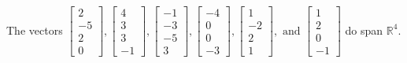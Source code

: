 \begin{exercise}
\begin{exerciseStatement}
  \end{exerciseStatement}
  \begin{exerciseAnswer}
   The vectors \(\left[\begin{array}{r}
2 \\
-5 \\
2 \\
0
\end{array}\right] , \left[\begin{array}{r}
4 \\
3 \\
3 \\
-1
\end{array}\right] , \left[\begin{array}{r}
-1 \\
-3 \\
-5 \\
3
\end{array}\right] , \left[\begin{array}{r}
-4 \\
0 \\
0 \\
-3
\end{array}\right] , \left[\begin{array}{r}
1 \\
-2 \\
2 \\
1
\end{array}\right] , \text{ and } \left[\begin{array}{r}
1 \\
2 \\
0 \\
-1
\end{array}\right]\) 
  	 do  
	span \(\mathbb{R}^4\).
  


  \end{exerciseAnswer}
\end{exercise}